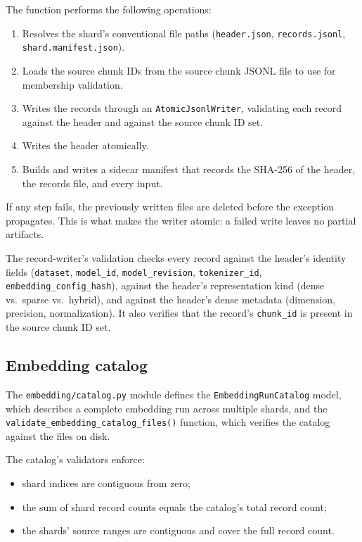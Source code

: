 \documentclass[11pt,a4paper]{article}
\begin{document}
The function performs the following operations:

\begin{enumerate}[leftmargin=1.5em,itemsep=0.15em]
  \item Resolves the shard's conventional file paths
    (\texttt{header.json}, \texttt{records.jsonl},
    \texttt{shard.manifest.json}).
  \item Loads the source chunk IDs from the source chunk JSONL file
    to use for membership validation.
  \item Writes the records through an \texttt{AtomicJsonlWriter},
    validating each record against the header and against the source
    chunk ID set.
  \item Writes the header atomically.
  \item Builds and writes a sidecar manifest that records the SHA-256
    of the header, the records file, and every input.
\end{enumerate}

If any step fails, the previously written files are deleted before
the exception propagates. This is what makes the writer atomic: a
failed write leaves no partial artifacts.

The record-writer's validation checks every record against the
header's identity fields (\texttt{dataset}, \texttt{model\_id},
\texttt{model\_revision}, \texttt{tokenizer\_id},
\texttt{embedding\_config\_hash}), against the header's
representation kind (dense vs.\ sparse vs.\ hybrid), and against the
header's dense metadata (dimension, precision, normalization). It also
verifies that the record's \texttt{chunk\_id} is present in the source
chunk ID set.

\subsection{Embedding catalog}
The \texttt{embedding/catalog.py} module defines the
\texttt{EmbeddingRunCatalog} model, which describes a complete
embedding run across multiple shards, and the
\texttt{validate\_embedding\_catalog\_files()} function, which
verifies the catalog against the files on disk.

The catalog's validators enforce:
\begin{itemize}[leftmargin=1.5em,itemsep=0.15em]
  \item shard indices are contiguous from zero;
  \item the sum of shard record counts equals the catalog's total
    record count;
  \item the shards' source ranges are contiguous and cover the full
    record count.
\end{itemize}
\end{document}
